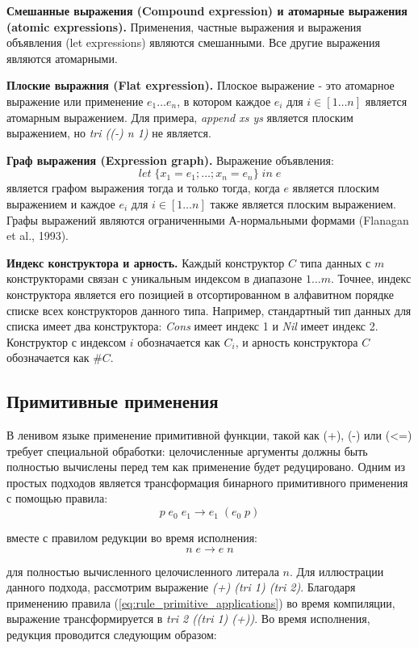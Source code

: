 \documentclass[flenqn, 14pt]{extarticle}
\begin{document}
\textbf{Смешанные выражения (Compound expression) и атомарные выражения (atomic expressions).} Применения, частные выражения и выражения объявления (let expressions) являются смешанными. Все другие выражения являются атомарными.

\textbf{Плоские выражния (Flat expression).} Плоское выражение - это атомарное выражение или применение $e_1 \ldots e_n$, в котором каждое $e_i$ для $i \in [1 \ldots n]$ является атомарным выражением. Для примера, \textit{append xs ys} является плоским выражением, но \textit{tri ((-) n 1)} не является.

\textbf{Граф выражения (Expression graph).} Выражение объявления:
$$
let \; \{ x_1 = e_1 ; \ldots ; x_n = e_n \} \; in \; e
$$
является графом выражения тогда и только тогда, когда $e$ является плоским выражением и каждое $e_i$ для $i \in [1 \ldots n]$ также является плоским выражением. Графы выражений являются ограниченными А-нормальными формами (Flanagan et al., 1993). 

\textbf{Индекс конструктора и арность.} Каждый конструктор $C$ типа данных с $m$ конструкторами связан с уникальным индексом в диапазоне $1 \ldots m$. Точнее, индекс конструктора является его позицией в отсортированном в алфавитном порядке списке всех конструкторов данного типа. Например, стандартный тип данных для списка имеет два конструктора: \textit{Cons} имеет индекс 1 и \textit{Nil} имеет индекс 2. Конструктор с индексом $i$ обозначается как $C_i$, и арность конструктора $C$ обозначается как $\#C$.

\subsection{Примитивные применения}
В ленивом языке применение примитивной функции, такой как (+), (-) или (<=) требует специальной обработки: целочисленные аргументы должны быть полностью вычислены перед тем как применение будет редуцировано. Одним из простых подходов является трансформация бинарного примитивного применения с помощью правила:
\begin{equation} \label{eq:rule_primitive_applications}
p \; e_0 \; e_1 \rightarrow e_1 \; (e_0 \; p)
\end{equation}

вместе с правилом редукции во время исполнения:
\begin{equation} \label{eq:reduce_primitive_applications}
n \; e \rightarrow e \; n
\end{equation}

для полностью вычисленного целочисленного литерала $n$. Для иллюстрации данного подхода, рассмотрим выражение \textit{(+) (tri 1) (tri 2)}. Благодаря применению правила (\ref{eq:rule_primitive_applications}) во время компиляции, выражение трансформируется в \textit{tri 2 ((tri 1) (+))}. Во время исполнения, редукция проводится следующим образом:
\end{document}
